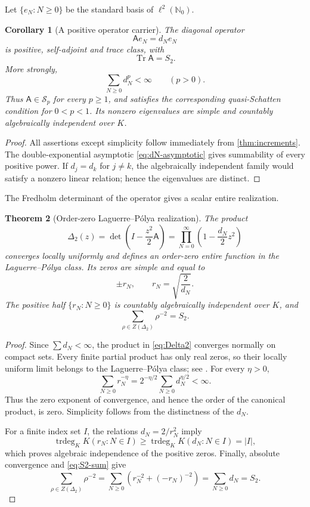 \documentclass[11pt]{article}
\theoremstyle{keio}
\newtheorem{theorem}{Theorem}[section]
\newtheorem{corollary}[theorem]{Corollary}
\theoremstyle{definition}
\theoremstyle{remark}
\newcommand{\N}{\mathbb N}
\newcommand{\trdeg}{\operatorname{trdeg}}
\newcommand{\Tr}{\operatorname{Tr}}
\begin{document}
Let \(\{e_N:N\ge0\}\) be the standard basis of \(\ell^2(\N_0)\).

\begin{corollary}[A positive operator carrier]
\label{cor:operator}
The diagonal operator
\[
 \mathsf A e_N=d_Ne_N
\]
is positive, self-adjoint and trace class, with
\[
 \Tr\mathsf A=S_2.
\]
More strongly,
\[
 \sum_{N\ge0}d_N^p<\infty\qquad(p>0).
\]
Thus \(\mathsf A\in\mathcal S_p\) for every \(p\ge1\), and satisfies the
corresponding quasi-Schatten condition for \(0<p<1\).  Its nonzero
eigenvalues are simple and countably algebraically independent over \(K\).
\end{corollary}

\begin{proof}
All assertions except simplicity follow immediately from
\cref{thm:increments}.  The double-exponential asymptotic
\eqref{eq:dN-asymptotic} gives summability of every positive power.  If
\(d_j=d_k\) for \(j\ne k\), the algebraically independent family would
satisfy a nonzero linear relation; hence the eigenvalues are distinct.
\end{proof}

The Fredholm determinant of the operator gives a scalar entire realization.

\begin{theorem}[Order-zero Laguerre--P\'olya realization]
\label{thm:Delta2}
The product
\begin{equation}\label{eq:Delta2}
 \Delta_2(z)=
 \det\!\left(I-\frac{z^2}{2}\mathsf A\right)
 =\prod_{N=0}^\infty\left(1-\frac{d_N}{2}z^2\right)
\end{equation}
converges locally uniformly and defines an order-zero entire function in the
Laguerre--P\'olya class.  Its zeros are simple and equal to
\[
 \pm r_N,\qquad r_N=\sqrt{\frac2{d_N}}.
\]
The positive half \(\{r_N:N\ge0\}\) is countably algebraically independent
over \(K\), and
\begin{equation}\label{eq:Delta2-trace}
 \boxed{\displaystyle
 \sum_{\rho\in Z(\Delta_2)}\rho^{-2}=S_2.}
\end{equation}
\end{theorem}

\begin{proof}
Since \(\sum d_N<\infty\), the product in \eqref{eq:Delta2} converges
normally on compact sets.  Every finite partial product has only real zeros,
so their locally uniform limit belongs to the Laguerre--P\'olya class; see
\cite[Chapter~VIII]{Levin1996}.  For every \(\eta>0\),
\[
 \sum_{N\ge0}r_N^{-\eta}
 =2^{-\eta/2}\sum_{N\ge0}d_N^{\eta/2}<\infty.
\]
Thus the zero exponent of convergence, and hence the order of the canonical
product, is zero.  Simplicity follows from the distinctness of the \(d_N\).

For a finite index set \(I\), the relations \(d_N=2/r_N^2\) imply
\[
 \trdeg_KK(r_N:N\in I)
 \ge \trdeg_KK(d_N:N\in I)=|I|,
\]
which proves algebraic independence of the positive zeros.  Finally,
absolute convergence and \eqref{eq:S2-sum} give
\[
 \sum_{\rho\in Z(\Delta_2)}\rho^{-2}
 =\sum_{N\ge0}\left(r_N^{-2}+(-r_N)^{-2}\right)
 =\sum_{N\ge0}d_N=S_2.
\]
\end{proof}
\end{document}
